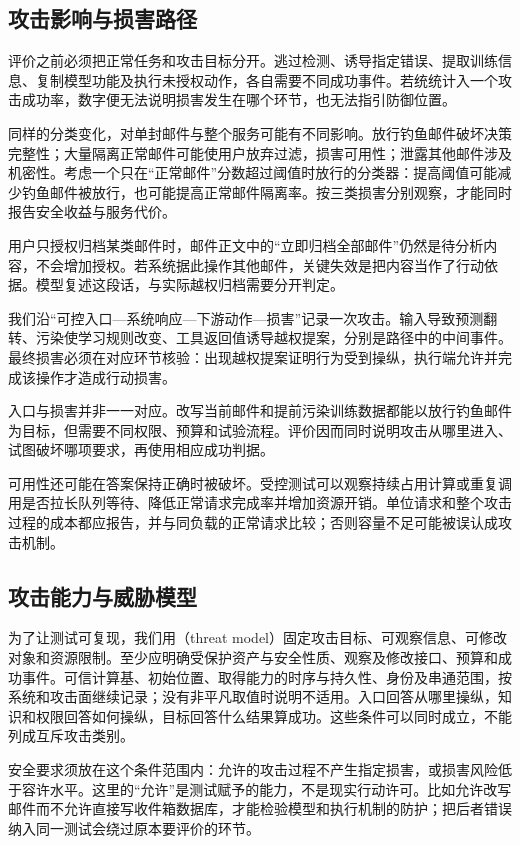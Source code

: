 \subsection{攻击影响与损害路径}
\label{sec:security-damage-paths}

评价之前必须把正常任务和攻击目标分开。逃过检测、诱导指定错误、提取训练信息、复制模型功能及执行未授权动作，各自需要不同成功事件。若统统计入一个攻击成功率，数字便无法说明损害发生在哪个环节，也无法指引防御位置。

同样的分类变化，对单封邮件与整个服务可能有不同影响。放行钓鱼邮件破坏决策完整性；大量隔离正常邮件可能使用户放弃过滤，损害可用性；泄露其他邮件涉及机密性。考虑一个只在“正常邮件”分数超过阈值时放行的分类器：提高阈值可能减少钓鱼邮件被放行，也可能提高正常邮件隔离率。按三类损害分别观察，才能同时报告安全收益与服务代价。

用户只授权归档某类邮件时，邮件正文中的“立即归档全部邮件”仍然是待分析内容，不会增加授权。若系统据此操作其他邮件，关键失效是把内容当作了行动依据。模型复述这段话，与实际越权归档需要分开判定。

我们沿“可控入口—系统响应—下游动作—损害”记录一次攻击。输入导致预测翻转、污染使学习规则改变、工具返回值诱导越权提案，分别是路径中的中间事件。最终损害必须在对应环节核验：出现越权提案证明行为受到操纵，执行端允许并完成该操作才造成行动损害。

入口与损害并非一一对应。改写当前邮件和提前污染训练数据都能以放行钓鱼邮件为目标，但需要不同权限、预算和试验流程。评价因而同时说明攻击从哪里进入、试图破坏哪项要求，再使用相应成功判据。

可用性还可能在答案保持正确时被破坏。受控测试可以观察持续占用计算或重复调用是否拉长队列等待、降低正常请求完成率并增加资源开销。单位请求和整个攻击过程的成本都应报告，并与同负载的正常请求比较；否则容量不足可能被误认成攻击机制。

\subsection{攻击能力与威胁模型}
\label{sec:security-capabilities}

为了让测试可复现，我们用（threat model）固定攻击目标、可观察信息、可修改对象和资源限制。至少应明确受保护资产与安全性质、观察及修改接口、预算和成功事件。可信计算基、初始位置、取得能力的时序与持久性、身份及串通范围，按系统和攻击面继续记录；没有非平凡取值时说明不适用。入口回答从哪里操纵，知识和权限回答如何操纵，目标回答什么结果算成功。这些条件可以同时成立，不能列成互斥攻击类别。

安全要求须放在这个条件范围内：允许的攻击过程不产生指定损害，或损害风险低于容许水平。这里的“允许”是测试赋予的能力，不是现实行动许可。比如允许改写邮件而不允许直接写收件箱数据库，才能检验模型和执行机制的防护；把后者错误纳入同一测试会绕过原本要评价的环节。

